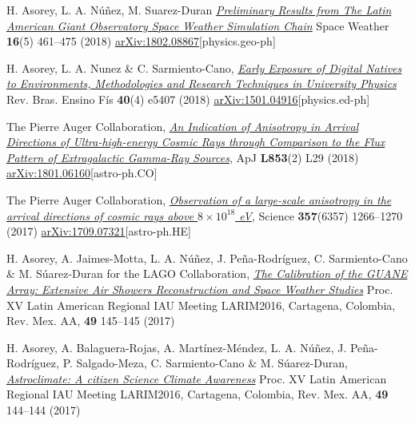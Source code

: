 \noindent
\begin{etaremune}
\item {}H. Asorey, L. A. Núñez, M. Suarez-Duran \href{https://doi.org/10.1002/2017SW001774}{\emph{Preliminary Results from The Latin American Giant Observatory Space Weather Simulation Chain}} Space Weather {\bf{16}}(5) 461--475 (2018) \href{https://arxiv.org/abs/1802.08867}{arXiv:1802.08867}[physics.geo-ph]

\item {} H. Asorey, L. A. Nunez \& C. Sarmiento-Cano, \href{http://dx.doi.org/10.1590/1806-9126-rbef-2018-0092}{\emph{Early Exposure of Digital Natives to Environments, Methodologies and Research Techniques in University Physics}} Rev. Bras. Ensino Fís {\bf{40}}(4) e5407 (2018) \href{http://arxiv.org/abs/1501.04916}{arXiv:1501.04916}[physics.ed-ph]

\item {}The Pierre Auger Collaboration, \href{https://doi.org/10.3847/2041-8213/aaa66d}{\emph{An Indication of Anisotropy in Arrival Directions of Ultra-high-energy Cosmic Rays through Comparison to the Flux Pattern of Extragalactic Gamma-Ray Sources}}, ApJ {\bf{L853}}(2) L29 (2018) \href{https://arxiv.org/abs/1801.06160}{arXiv:1801.06160}[astro-ph.CO]

\item {}The Pierre Auger Collaboration, \href{https://doi.org/10.1126/science.aan4338}{\emph{Observation of a large-scale anisotropy in the arrival directions of cosmic rays above $8\times 10^{18}$ eV}}, Science {\bf{357}}(6357) 1266--1270 (2017) \href{https://arxiv.org/abs/1709.07321}{arXiv:1709.07321}[astro-ph.HE]

\item {} H. Asorey, A. Jaimes-Motta, L. A. Núñez, J. Peña-Rodríguez, C. Sarmiento-Cano \& M. Súarez-Duran for the LAGO Collaboration, \href{http://www.astroscu.unam.mx/rmaa/RMxAC..49/PDF/RMxAC..49\_poster3.pdf}{\emph{The Calibration of the GUANE Array: Extensive Air Showers Reconstruction and Space Weather Studies}} \en Proc. XV Latin American Regional IAU Meeting LARIM2016, Cartagena, Colombia, Rev. Mex. AA, {\bf{49}} 145--145 (2017)

\item {} H. Asorey, A. Balaguera-Rojas, A. Martínez-Méndez, L. A. Núñez, J. Peña-Rodríguez, P. Salgado-Meza, C. Sarmiento-Cano \& M. Súarez-Duran, \href{http://www.astroscu.unam.mx/rmaa/RMxAC..49/PDF/RMxAC..49\_poster2.pdf}{\emph{Astroclimate: A citizen Science Climate Awareness}} \en Proc. XV Latin American Regional IAU Meeting LARIM2016, Cartagena, Colombia, Rev. Mex. AA, {\bf{49}} 144--144 (2017)


\end{etaremune}
